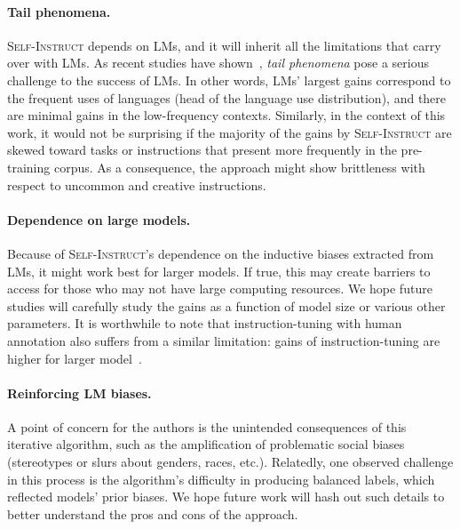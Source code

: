 \documentclass[11pt]{article}
\newcommand{\daniel}[1]{\textcolor{blue}{[DK: #1]}}
\newcommand{\nascomment}[1]{\textcolor{blue}{\textbf{[#1 -- \textsc{nas}]}}}
\newcommand{\name}{\textsc{Self-Instruct}}
\begin{document}
\paragraph{Tail phenomena.} 
\name{} depends on LMs, and it will inherit all the limitations that carry over with LMs. 
As recent studies have shown~\cite{razeghi2022impact,kandpal2022large},  \emph{tail phenomena} pose a serious challenge to the success of LMs. In other words, LMs' largest gains correspond to the frequent uses of languages (head of the language use distribution), and there are minimal gains in the low-frequency contexts. 
Similarly, in the context of this work, it would not be surprising if the majority of the gains by \name{} are skewed toward 
tasks or instructions that present more frequently in the pre-training corpus. 
As a consequence, the approach might show brittleness with respect to uncommon and creative instructions.



\paragraph{Dependence on large models.} 
Because of \name's dependence on the inductive biases extracted from LMs, it might work best for larger models. 
If true, this may create barriers to access for those who may not have large computing resources. 
We hope future studies will carefully study the gains as a function of model size or various other parameters. 
It is worthwhile to note that instruction-tuning with human annotation also suffers from a similar limitation: gains of instruction-tuning are higher for larger model~\cite{wei2022finetuned}. 

\paragraph{Reinforcing LM biases.}
A point of concern for the authors is the unintended consequences of this iterative algorithm, such as the amplification of problematic social biases (stereotypes or slurs about genders, races, etc.). 
Relatedly, one observed challenge in this process is the algorithm's difficulty in producing balanced labels, which reflected models' prior biases. 
We hope future work will hash out such details to better understand the pros and cons of the approach. 
\end{document}
